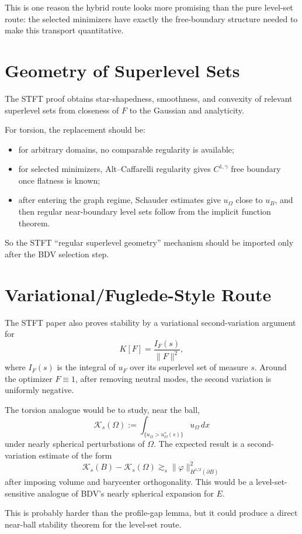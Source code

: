 \documentclass[11pt]{article}
\begin{document}
This is one reason the hybrid route looks more promising than the pure
level-set route: the selected minimizers have exactly the free-boundary
structure needed to make this transport quantitative.

\section{Geometry of Superlevel Sets}

The STFT proof obtains star-shapedness, smoothness, and convexity of relevant
superlevel sets from closeness of \(F\) to the Gaussian and analyticity.

For torsion, the replacement should be:
\begin{itemize}
\item for arbitrary domains, no comparable regularity is available;
\item for selected minimizers, Alt--Caffarelli regularity gives \(C^{1,\gamma}\)
free boundary once flatness is known;
\item after entering the graph regime, Schauder estimates give \(u_\Omega\)
close to \(u_B\), and then regular near-boundary level sets follow from the
implicit function theorem.
\end{itemize}
So the STFT ``regular superlevel geometry'' mechanism should be imported only
after the BDV selection step.

\section{Variational/Fuglede-Style Route}

The STFT paper also proves stability by a variational second-variation argument
for
\[
K[F]=\frac{I_F(s)}{\|F\|^2},
\]
where \(I_F(s)\) is the integral of \(u_F\) over its superlevel set of measure
\(s\). Around the optimizer \(F\equiv1\), after removing neutral modes, the
second variation is uniformly negative.

The torsion analogue would be to study, near the ball,
\[
\mathcal K_s(\Omega)
:=
\int_{\{u_\Omega>u_\Omega^*(s)\}}u_\Omega\,dx
\]
under nearly spherical perturbations of \(\Omega\). The expected result is a
second-variation estimate of the form
\[
\mathcal K_s(B)-\mathcal K_s(\Omega)
\gtrsim_s
\|\varphi\|_{H^{1/2}(\partial B)}^2
\]
after imposing volume and barycenter orthogonality. This would be a
level-set-sensitive analogue of BDV's nearly spherical expansion for \(E\).

This is probably harder than the profile-gap lemma, but it could produce a
direct near-ball stability theorem for the level-set route.
\end{document}
